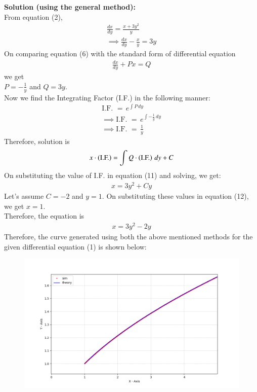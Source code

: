 \documentclass[journal]{IEEEtran}
\begin{document}
\begin{enumerate}
\textbf{Solution (using the general method):}\\
From equation (2), 
\begin{align}
    \frac{dx}{dy} = \frac{x+3y^2}{y}\\
    \implies \frac{dx}{dy} - \frac{x}{y} = 3y
\end{align}
On comparing equation (6) with the standard form of differential equation 
\begin{align}
    \frac{dx}{dy} + Px = Q
\end{align}
we get\\
$P = -\frac{1}{y}$ and $Q = 3y$.\\
Now we find the Integrating Factor (I.F.) in the following manner:
\begin{align}
    \text{I.F. } = \,e^{\int P \,dy}\\
    \implies \text{I.F. } = \,e^{\int -\frac{1}{y}\, dy}\\
    \implies \text{I.F. } = \,\frac{1}{y}
\end{align}
Therefore, solution is
\begin{align}
    x \cdot \left(\text{I.F.}\right) = \int Q \cdot \left(\text{I.F.}\right)  \,dy + C
\end{align}
On substituting the value of I.F. in equation (11) and solving, we get:
\begin{align}
    x = 3y^2 + Cy
\end{align}
Let's assume $C = -2$ and $y=1$. On substituting these values in equation (12), we get $x = 1$.\\
Therefore, the equation is
\begin{align*}
    x = 3y^2 - 2y
\end{align*}
Therefore, the curve generated using both the above mentioned methods for the given differential equation (1) is shown below:
\begin{figure}[H]
    \centering
    \includegraphics[width = \columnwidth]{figs/fig.png}
\end{figure}
\end{enumerate}
\end{document}

